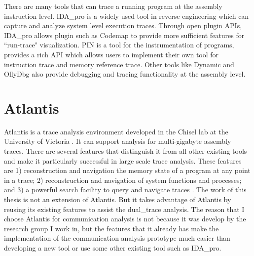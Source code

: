 There are many tools that can trace a running program at the assembly instruction level.  IDA\_pro \cite{eagle_ida_2008} is a widely used tool in reverse engineering which can capture and analyze system level execution traces. Through open plugin APIs, IDA\_pro allows plugin such as Codemap \cite{_c0demap/codemap:_????} to provide more sufficient features for ``run-trace" visualization. PIN \cite{_pin_????} is a tool for the instrumentation of programs, provides a rich API which allows users to implement their own tool for instruction trace and memory reference trace. Other tools like Dynamic \cite{brueningqz} and OllyDbg \cite{yuschuk2007ollydbg} also provide debugging and tracing functionality at the assembly level. 

\section{Atlantis}
Atlantis is a trace analysis environment developed in the Chisel lab at the University of Victoria \cite{huang2017atlantis}. It can support analysis for multi-gigabyte assembly traces. There are several features that distinguish it from all other existing tools and make it particularly successful in large scale trace analysis. These features are 1) reconstruction and navigation the memory state of a program at any point in a trace; 2) reconstruction and navigation of system functions and processes; and 3) a powerful search facility to query and navigate traces \cite{huang2017atlantis}. The work of this thesis is not an extension of Atlantis. But it takes advantage of Atlantis by reusing its existing features to assist the dual\_trace analysis. The reason that I choose Atlantis for communication analysis is not because it was develop by the research group I work in, but the features that it already has make the implementation of the communication analysis prototype much easier than developing a new tool or use some other existing tool such as IDA\_pro.




